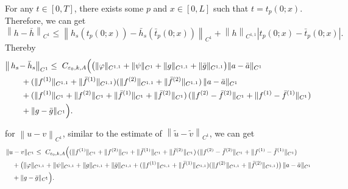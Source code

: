 \documentclass[a4paper,reqno,11pt]{amsart}
\numberwithin{equation}{section} %
\begin{document}
For any $t\in [0,T]$, there exists some $p$ and $x\in [0,L]$ such that $t=t_p(0;x)$. Therefore, we can get
$$
\left\| h-\bar{h} \right\| _{C^1}\le \left\| h_s\left( t_p(0;x) \right) -\bar{h}_s\left( \bar{t}_p(0;x) \right) \right\| _{C^1}+\left\| h \right\| _{C^{1,1}}\left| t_p(0;x)-\bar{t}_p(0;x) \right|.
$$
Thereby
\[
\begin{aligned}
&\bigl\|\,h_s\!-\bar h_s\!\,\bigr\|_{C^{1}}
\le{}\ C_{\varepsilon_0,k,A}\Bigl(
	\bigl(\|\varphi\|_{C^{1,1}}+\|\psi\|_{C^{1}}
     + \|g\|_{C^{1,1}}+\|\bar g\|_{C^{1,1}}\bigr)\|a-\bar a\|_{C^{1}}
 \\
&\qquad
     + (\|f^{(1)}\|_{C^{1,1}}+\|\bar f^{(1)}\|_{C^{1,1}})
       (\|f^{(2)}\|_{C^{1,1}}+\|\bar f^{(2)}\|_{C^{1,1}})\,
    \|a-\bar a\|_{C^{1}} \\
&\qquad
	 + (\|f^{(1)}\|_{C^{1}}+\|f^{(2)}\|_{C^{1}}
   +\|\bar f^{(1)}\|_{C^{1}}+\|\bar f^{(2)}\|_{C^{1}})\,
  (\|f^{(2)}-\bar f^{(2)}\|_{C^{1}}
   +\|f^{(1)}-\bar f^{(1)}\|_{C^{1}})\\
&\qquad
  + \|g-\bar g\|_{C^{1}}
\Bigr).
\end{aligned}
\]

for $\left\| u-v \right\| _{C^1}$, similar to the estimate of $\left\| \tilde{u}-\tilde{v} \right\| _{C^1}$, we can get
\[
\begin{aligned}
&\|u-v\|_{C^{1}}
\le{}\ C_{\varepsilon_0,k,A}\Bigl(
  (\|f^{(1)}\|_{C^{1}}+\|f^{(2)}\|_{C^{1}}
   +\|\bar f^{(1)}\|_{C^{1}}+\|\bar f^{(2)}\|_{C^{1}})\,
  (\|f^{(2)}-\bar f^{(2)}\|_{C^{1}}
   +\|f^{(1)}-\bar f^{(1)}\|_{C^{1}}) \\
&\quad + \bigl(\|\varphi\|_{C^{1,1}}+\|\psi\|_{C^{1,1}}
   + \|g\|_{C^{1,1}}+\|\bar g\|_{C^{1,1}}
   + (\|f^{(1)}\|_{C^{1,1}}+\|\bar f^{(1)}\|_{C^{1,1}})
     (\|f^{(2)}\|_{C^{1,1}}+\|\bar f^{(2)}\|_{C^{1,1}})\bigr)\,
   \|a-\bar a\|_{C^{1}} \\
&\quad + \|g-\bar g\|_{C^{1}}
\Bigr).
\end{aligned}
\]
\end{document}
